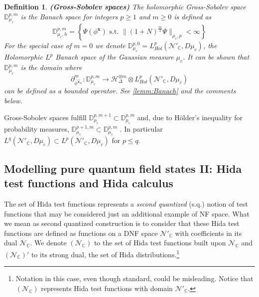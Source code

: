 \documentclass{elsarticle}%
\newtheorem{definition}{Definition}%
\begin{document}
 \begin{definition}{\textbf{(Gross-Sobolev spaces)}}
     \label{def:grossSobolev}
    The holomorphic Gross-Sobolev space $\mathbb{D}^{p,m}_{\mu_c}$ is the Banach space for integers $p\geq 1$ and $m\geq0$ is defined as 
        \begin{equation}
        \label{eq:GrossSobolev2}
        \mathbb{D}_{\mu_c,h}^{p,m}=\left\{\Psi(\phi^\mathbf{x}) \textrm{ s.t. } \lVert (1+N)^{\frac{m}2} \Psi \rVert_{\mu_c,p}< \infty \right\}
    \end{equation}
    For the special case of $m=0$ we denote $\mathbb{D}_{\mu_c}^{p,0}=L^p_{Hol}(\mathcal{N}'_{\mathbb{C}},D\mu_c)$, the Holomorphic $L^p$ Banach space of the Gaussian measure $\mu_c$. It can be shown \cite{huAnalysisGaussian2016} that $\mathbb{D}_{\mu_c}^{p,m}$ is the domain where $$\partial_{\phi^{\vec{\mathbf{x}}_m}}^m: \mathbb{D}_{\mu_c}^{p,m}\longrightarrow \mathcal{H}_\Delta^{\otimes m}\otimes L^p_{Hol}(\mathcal{N}'_\mathbb{C},D\mu_c)$$ can be defined as a bounded operator. See \autoref{lemm:Banach} and the comments below.  
 \end{definition}

 Gross-Sobolev spaces fulfill  $\mathbb{D}_{\mu_c}^{p,m+1}\subset \mathbb{D}_{\mu_c}^{p,m}$ and, due to Hölder's inequality for probability measures,  $\mathbb{D}_{\mu_c}^{p+1,m}\subset \mathbb{D}_{\mu_c}^{p,m}$  . In particular $L^q(\mathcal{N}'_{\mathbb{C}},D\mu_c)\subset L^p(\mathcal{N}'_{\mathbb{C}},D\mu_c)$ for $p \leq q$. 



\subsection{Modelling pure quantum field  states II: Hida test functions and Hida calculus}
\label{sec:Hida}


    The set of Hida test functions   represents a \textit{second quantized} (s.q.)  notion of test functions that may be considered just an additional example of NF space. What we mean as second quantized construction is to consider that these Hida test functions are defined as  functions on a DNF space $\mathcal{N}'_{\mathbb{C}}$ with coefficients in its dual $\mathcal{N}_{\mathbb{C}}$. We denote $(\mathcal{N}_{\mathbb{C}})$ to the set of Hida test functions built upon $\mathcal{N}_{\mathbb{C}}$ and $(\mathcal{N}_{\mathbb{C}})'$ to its strong dual, the set of Hida distributions.\footnote{Notation in this case, even though standard, could be misleading. Notice  that $(\mathcal{N}_{\mathbb{C}})$ represents Hida test functions with domain $\mathcal{N}'_{\mathbb{C}}$.} 
\end{document}
